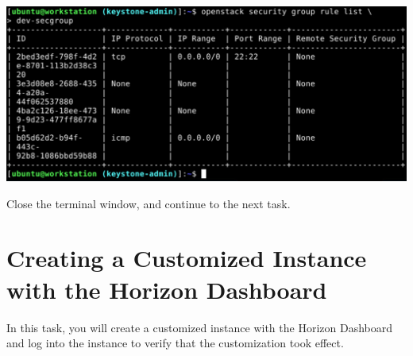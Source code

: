 \documentclass[letterpaper, 12pt]{article}
\begin{document}
\begin{enumerate}
\begin{labstep}
        \begin{center}
            \includegraphics[width=\linewidth]{images/part1/step30.png}
        \end{center}
    \end{labstep}

    \begin{labstep}
        Close the terminal window, and continue to the next task.
    \end{labstep}
\end{enumerate}

\section{Creating a Customized Instance with the Horizon Dashboard}\label{sec:creating-a-customized-instance-with-the-horizon-dashboard}
In this task, you will create a customized instance with the Horizon Dashboard and log into the instance to verify that the customization took effect.
\end{document}
